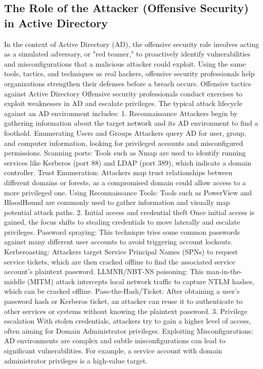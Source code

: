 \subsection{The Role of the Attacker (Offensive Security) in Active Directory}
In the context of Active Directory (AD), the offensive security role involves acting as a simulated adversary, or "red teamer," to proactively identify vulnerabilities and misconfigurations that a malicious attacker could exploit. Using the same tools, tactics, and techniques as real hackers, offensive security professionals help organizations strengthen their defenses before a breach occurs. 
Offensive tactics against Active Directory
Offensive security professionals conduct exercises to exploit weaknesses in AD and escalate privileges. The typical attack lifecycle against an AD environment includes:
1. Reconnaissance
Attackers begin by gathering information about the target network and its AD environment to find a foothold.
Enumerating Users and Groups Attackers query AD for user, group, and computer information, looking for privileged accounts and misconfigured permissions.
Scanning ports: Tools such as Nmap are used to identify running services like Kerberos (port 88) and LDAP (port 389), which indicate a domain controller.
Trust Enumeration: Attackers map trust relationships between different domains or forests, as a compromised domain could allow access to a more privileged one.
Using Reconnaissance Tools: Tools such as PowerView and BloodHound are commonly used to gather information and visually map potential attack paths. 
2. Initial access and credential theft
Once initial access is gained, the focus shifts to stealing credentials to move laterally and escalate privileges.
Password spraying: This technique tries some common passwords against many different user accounts to avoid triggering account lockouts.
Kerberoasting: Attackers target Service Principal Names (SPNs) to request service tickets, which are then cracked offline to find the associated service account's plaintext password.
LLMNR/NBT-NS poisoning: This man-in-the-middle (MITM) attack intercepts local network traffic to capture NTLM hashes, which can be cracked offline.
Pass-the-Hash/Ticket: After obtaining a user's password hash or Kerberos ticket, an attacker can reuse it to authenticate to other services or systems without knowing the plaintext password. 
3. Privilege escalation
With stolen credentials, attackers try to gain a higher level of access, often aiming for Domain Administrator privileges.
Exploiting Misconfigurations: AD environments are complex and subtle misconfigurations can lead to significant vulnerabilities. For example, a service account with domain administrator privileges is a high-value target.
